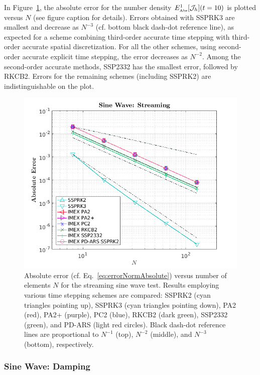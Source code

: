 In Figure~\ref{fig:SineWaveStreaming}, the absolute error for the number density $E_{\mbox{\tiny Abs}}^{1}[\mathcal{J}_{h}](t=10)$ is plotted versus $N$ (see figure caption for details).  
Errors obtained with SSPRK3 are smallest and decrease as $N^{-3}$ (cf. bottom black dash-dot reference line), as expected for a scheme combining third-order accurate time stepping with third-order accurate spatial discretization.  
For all the other schemes, using second-order accurate explicit time stepping, the error decreases as $N^{-2}$.  
Among the second-order accurate methods, SSP2332 has the smallest error, followed by RKCB2.  
Errors for the remaining schemes (including SSPRK2) are indistinguishable on the plot.  
\begin{figure}[H]
  \centering
    \includegraphics[width=\textwidth]{figures/SineWaveStreaming}
   \caption{Absolute error (cf. Eq.~\eqref{eq:errorNormAbsolute}) versus number of elements $N$ for the streaming sine wave test.  Results employing various time stepping schemes are compared: SSPRK2 (cyan triangles pointing up), SSPRK3 (cyan triangles pointing down), PA2 (red), PA2+ (purple), PC2 (blue), RKCB2 (dark green), SSP2332 (green), and PD-ARS (light red circles).  Black dash-dot reference lines are proportional to $N^{-1}$ (top), $N^{-2}$ (middle), and $N^{-3}$ (bottom), respectively.}
  \label{fig:SineWaveStreaming}
\end{figure}

\subsubsection{Sine Wave: Damping}


